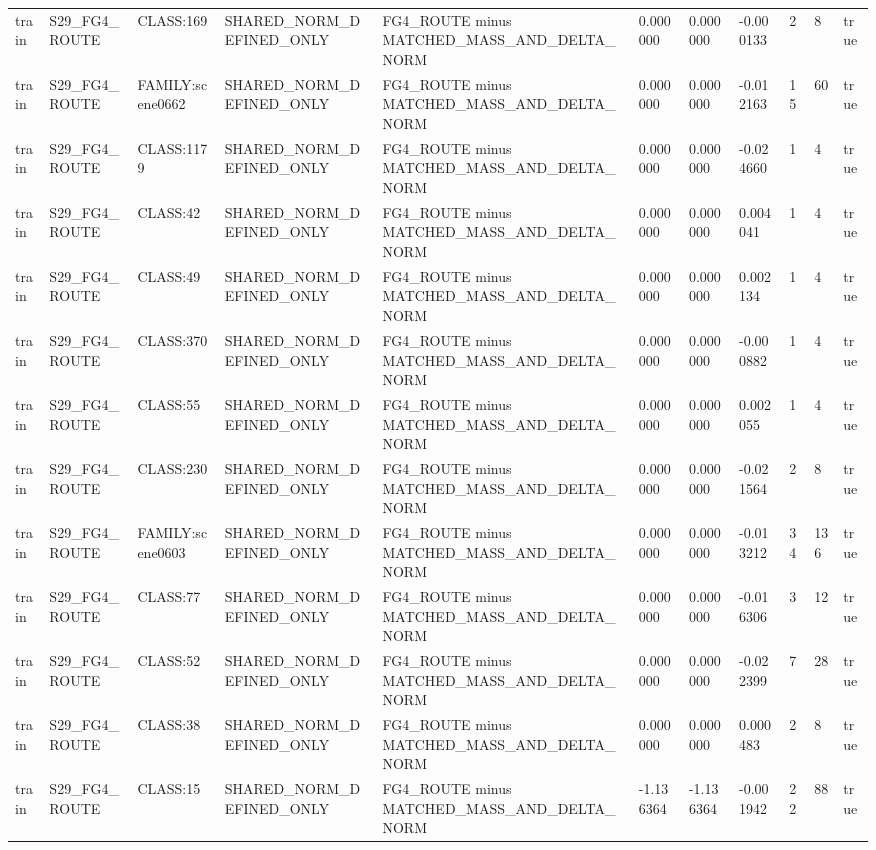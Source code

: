 \begin{tabular}{lllllllllll}
train & S29\_FG4\_ROUTE & CLASS:169 & SHARED\_NORM\_DEFINED\_ONLY & FG4\_ROUTE minus MATCHED\_MASS\_AND\_DELTA\_NORM & 0.000000 & 0.000000 & -0.000133 & 2 & 8 & true \\
train & S29\_FG4\_ROUTE & FAMILY:scene0662 & SHARED\_NORM\_DEFINED\_ONLY & FG4\_ROUTE minus MATCHED\_MASS\_AND\_DELTA\_NORM & 0.000000 & 0.000000 & -0.012163 & 15 & 60 & true \\
train & S29\_FG4\_ROUTE & CLASS:1179 & SHARED\_NORM\_DEFINED\_ONLY & FG4\_ROUTE minus MATCHED\_MASS\_AND\_DELTA\_NORM & 0.000000 & 0.000000 & -0.024660 & 1 & 4 & true \\
train & S29\_FG4\_ROUTE & CLASS:42 & SHARED\_NORM\_DEFINED\_ONLY & FG4\_ROUTE minus MATCHED\_MASS\_AND\_DELTA\_NORM & 0.000000 & 0.000000 & 0.004041 & 1 & 4 & true \\
train & S29\_FG4\_ROUTE & CLASS:49 & SHARED\_NORM\_DEFINED\_ONLY & FG4\_ROUTE minus MATCHED\_MASS\_AND\_DELTA\_NORM & 0.000000 & 0.000000 & 0.002134 & 1 & 4 & true \\
train & S29\_FG4\_ROUTE & CLASS:370 & SHARED\_NORM\_DEFINED\_ONLY & FG4\_ROUTE minus MATCHED\_MASS\_AND\_DELTA\_NORM & 0.000000 & 0.000000 & -0.000882 & 1 & 4 & true \\
train & S29\_FG4\_ROUTE & CLASS:55 & SHARED\_NORM\_DEFINED\_ONLY & FG4\_ROUTE minus MATCHED\_MASS\_AND\_DELTA\_NORM & 0.000000 & 0.000000 & 0.002055 & 1 & 4 & true \\
train & S29\_FG4\_ROUTE & CLASS:230 & SHARED\_NORM\_DEFINED\_ONLY & FG4\_ROUTE minus MATCHED\_MASS\_AND\_DELTA\_NORM & 0.000000 & 0.000000 & -0.021564 & 2 & 8 & true \\
train & S29\_FG4\_ROUTE & FAMILY:scene0603 & SHARED\_NORM\_DEFINED\_ONLY & FG4\_ROUTE minus MATCHED\_MASS\_AND\_DELTA\_NORM & 0.000000 & 0.000000 & -0.013212 & 34 & 136 & true \\
train & S29\_FG4\_ROUTE & CLASS:77 & SHARED\_NORM\_DEFINED\_ONLY & FG4\_ROUTE minus MATCHED\_MASS\_AND\_DELTA\_NORM & 0.000000 & 0.000000 & -0.016306 & 3 & 12 & true \\
train & S29\_FG4\_ROUTE & CLASS:52 & SHARED\_NORM\_DEFINED\_ONLY & FG4\_ROUTE minus MATCHED\_MASS\_AND\_DELTA\_NORM & 0.000000 & 0.000000 & -0.022399 & 7 & 28 & true \\
train & S29\_FG4\_ROUTE & CLASS:38 & SHARED\_NORM\_DEFINED\_ONLY & FG4\_ROUTE minus MATCHED\_MASS\_AND\_DELTA\_NORM & 0.000000 & 0.000000 & 0.000483 & 2 & 8 & true \\
train & S29\_FG4\_ROUTE & CLASS:15 & SHARED\_NORM\_DEFINED\_ONLY & FG4\_ROUTE minus MATCHED\_MASS\_AND\_DELTA\_NORM & -1.136364 & -1.136364 & -0.001942 & 22 & 88 & true \\

\end{tabular}
